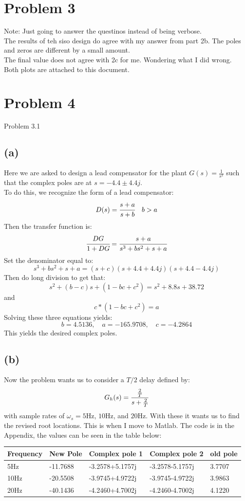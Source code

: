 \documentclass{article}
\begin{document}
\section*{Problem 3}
Note: Just going to answer the questinos instead of being verbose.\\

The results of teh siso design do agree with my answer from part 2b. The poles and zeros are different by a small amount.\\

The final value does not agree with 2c for me. Wondering what I did wrong.\\

Both plots are attached to this document.

\section*{Problem 4}
Problem 3.1\\
\subsection*{(a)}
Here we are asked to design a lead compensator for the plant $G(s)=\frac{1}{s^2}$ such that the complex poles are at $s=-4.4\pm 4.4j$.\\
To do this, we recognize the form of a lead compensator:
\[D(s)=\cfrac{s+a}{s+b}\quad b>a\]
Then the transfer function is:
\[\cfrac{DG}{1+DG}=\cfrac{s+a}{s^3+bs^2+s+a}\]
Set the denominator equal to:
\[s^3+bs^2+s+a=(s+c)(s+4.4+4.4j)(s+4.4-4.4j)\]
Then do long division to get that:
\[s^2+(b-c)s+(1-bc+c^2)=s^2+8.8s+38.72\]
and
\[c*(1-bc+c^2)=a\]
Solving these three equations yields:
\[b=4.5136,\quad a=-165.9708,\quad c=-4.2864\]
This yields the desired complex poles.
\subsection*{(b)}
Now the problem wants us to consider a $T/2$ delay defined by:
\[G_h(s)=\cfrac{\frac{2}{T}}{s+\frac{2}{T}}\]
with sample rates of $\omega_s=5$Hz, $10$Hz, and $20$Hz. With these it wants us to find the revised root locations. This is when I move to Matlab. The code is in the Appendix, the values can be seen in the table below:
\begin{table}[H]
    \centering
    \begin{tabular}{l|l|l|l|l|}
        \hline
        Frequency & New Pole & Complex pole 1 & Complex pole 2 & old pole\\\hline
        5Hz& -11.7688&-3.2578+5.1757j &-3.2578-5.1757j &3.7707 \\\hline
        10Hz& -20.5508&-3.9745+4.9722j &-3.9745-4.9722j &3.9863 \\\hline
        20Hz&-40.1436 &-4.2460+4.7002j &-4.2460-4.7002j &4.1220 \\\hline
    \end{tabular}
\end{table}
\end{document}
